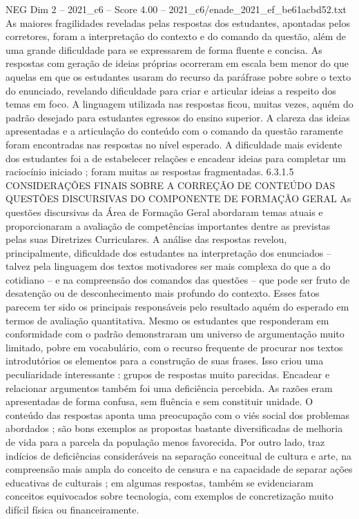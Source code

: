 \begin{textsample}{NEG Dim 2 – 2021\_c6 – Score 4.00 – 2021\_c6/enade\_2021\_ef\_be61acbd52.txt}
As maiores fragilidades reveladas pelas respostas dos estudantes, apontadas pelos corretores, foram a interpretação do contexto e do comando da questão, além de uma grande dificuldade para se expressarem de forma fluente e concisa.
As respostas com geração de ideias próprias ocorreram em escala bem menor do que aquelas em que os estudantes usaram do recurso da paráfrase pobre sobre o texto do enunciado, revelando dificuldade para criar e articular ideias a respeito dos temas em foco.
A linguagem utilizada nas respostas ficou, muitas vezes, aquém do padrão desejado para estudantes egressos do ensino superior.
A clareza das ideias apresentadas e a articulação do conteúdo com o comando da questão raramente foram encontradas nas respostas no nível esperado.
A dificuldade mais evidente dos estudantes foi a de estabelecer relações e encadear ideias para completar um raciocínio iniciado ; foram muitas as respostas fragmentadas. 6.3.1.5 CONSIDERAÇÕES FINAIS SOBRE A CORREÇÃO DE CONTEÚDO DAS QUESTÕES DISCURSIVAS DO COMPONENTE DE FORMAÇÃO GERAL As questões discursivas da Área de Formação Geral abordaram temas atuais e proporcionaram a avaliação de competências importantes dentre as previstas pelas suas Diretrizes Curriculares.
A análise das respostas revelou, principalmente, dificuldade dos estudantes na interpretação dos enunciados – talvez pela linguagem dos textos motivadores ser mais complexa do que a do cotidiano – e na compreensão dos comandos das questões – que pode ser fruto de desatenção ou de desconhecimento mais profundo do contexto.
Esses fatos parecem ter sido os principais responsáveis pelo resultado aquém do esperado em termos de avaliação quantitativa.
Mesmo os estudantes que responderam em conformidade com o padrão demonstraram um universo de argumentação muito limitado, pobre em vocabulário, com o recurso frequente de procurar nos textos introdutórios os elementos para a construção de suas frases.
Isso criou uma peculiaridade interessante : grupos de respostas muito parecidas.
Encadear e relacionar argumentos também foi uma deficiência percebida.
As razões eram apresentadas de forma confusa, sem fluência e sem constituir unidade.
O conteúdo das respostas aponta uma preocupação com o viés social dos problemas abordados ; são bons exemplos as propostas bastante diversificadas de melhoria de vida para a parcela da população menos favorecida.
Por outro lado, traz indícios de deficiências consideráveis na separação conceitual de cultura e arte, na compreensão mais ampla do conceito de censura e na capacidade de separar ações educativas de culturais ; em algumas respostas, também se evidenciaram conceitos equivocados sobre tecnologia, com exemplos de concretização muito difícil física ou financeiramente.

\end{textsample}
